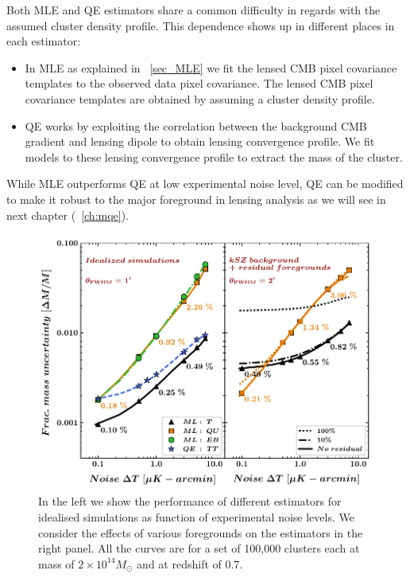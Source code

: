 Both MLE and QE estimators share a common difficulty in regards with the assumed cluster density profile.
This dependence shows up in different places in each estimator:
 \begin{itemize}
 \item In MLE as explained in ~\ref{sec_MLE} we fit the lensed CMB pixel covariance templates to the observed data pixel covariance. The lensed CMB pixel covariance templates are obtained by assuming a cluster density profile. 
 \item QE works by exploiting the correlation between the background CMB gradient and lensing dipole to obtain lensing convergence profile. 
 We fit models to these lensing convergence profile to extract the mass of the cluster.
 
 \end{itemize}
While MLE outperforms QE at low experimental noise level, QE can be modified to make it robust to the major foreground in lensing analysis as we will see in next chapter (~\ref{ch:mqe}).
 \begin{figure}[t]
\includegraphics[]{figs/fig1-eps-converted-to.pdf}
 \caption{In the left we show the performance of different estimators for idealised simulations as function of experimental noise levels. We consider the effects of various foregrounds on the estimators in the right panel. All the curves are for a set of 100,000 clusters each at mass of $2\times 10^{14} M_{\odot}$ and at redshift of 0.7.}
 \label{fig_performance}
 \end{figure}
   
